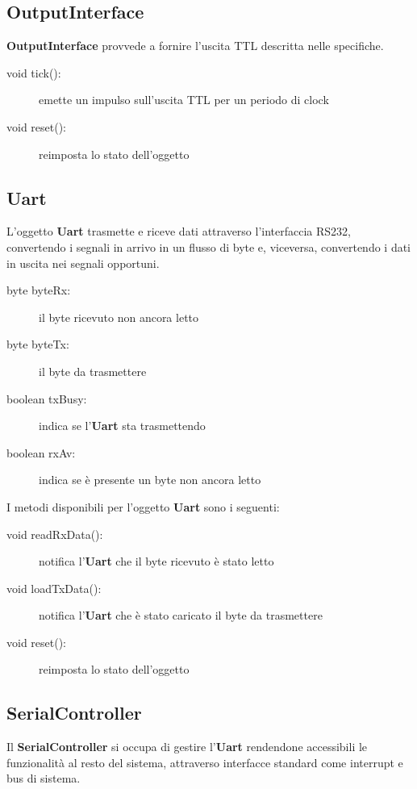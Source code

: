 \documentclass [11pt,a4paper,oneside]{paper}
\newcommand{\component}[1]{\textbf{#1}}
\begin{document}
\subsection{OutputInterface}
\component{OutputInterface} provvede a fornire l'uscita TTL descritta nelle
specifiche.

\begin{description}
\item[void tick():] emette un impulso sull'uscita TTL per un periodo di clock
\item[void reset():] reimposta lo stato dell'oggetto
\end{description}

\subsection{Uart}
L'oggetto \component{Uart} trasmette e riceve dati attraverso l'interfaccia RS232,
convertendo i segnali in arrivo in un flusso di byte e, viceversa, convertendo
i dati in uscita nei segnali opportuni.

\begin{description}
\item[byte byteRx:] il byte ricevuto non ancora letto
\item[byte byteTx:] il byte da trasmettere
\item[boolean txBusy:] indica se l'\component{Uart} sta trasmettendo
\item[boolean rxAv:] indica se è presente un byte non ancora letto
\end{description}

I metodi disponibili per l'oggetto \component{Uart} sono i seguenti:

\begin{description}
\item[void readRxData():] notifica l'\component{Uart} che il byte ricevuto è
    stato letto
\item[void loadTxData():] notifica l'\component{Uart} che è stato caricato il
    byte da trasmettere
\item[void reset():] reimposta lo stato dell'oggetto
\end{description}

\subsection{SerialController}
Il \component{SerialController} si occupa di gestire l'\component{Uart}
rendendone accessibili le funzionalità al resto del sistema,
attraverso interfacce standard come interrupt e bus di sistema.
\end{document}
